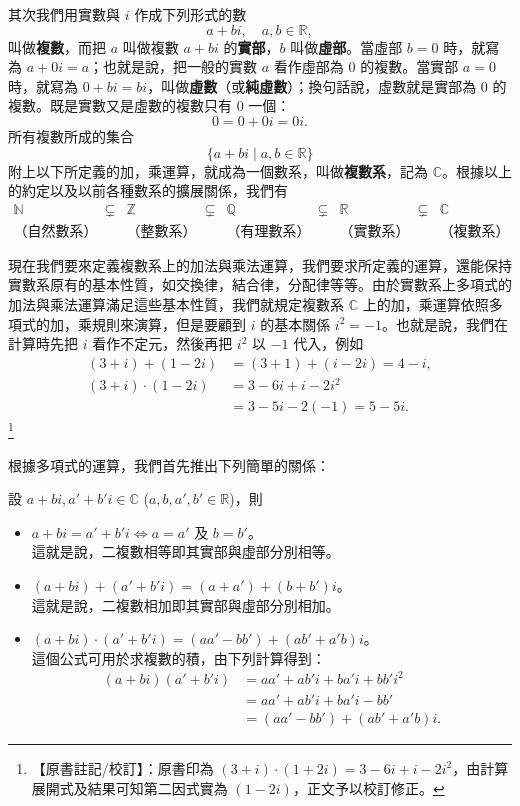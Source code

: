 其次我們用實數與 $i$ 作成下列形式的數
\[
a+bi, \quad a, b \in \mathbb{R},
\]
叫做\textbf{複數}，而把 $a$ 叫做複數 $a+bi$ 的\textbf{實部}，$b$ 叫做\textbf{虛部}。當虛部 $b=0$ 時，就寫為 $a+0i=a$；也就是說，把一般的實數 $a$ 看作虛部為 $0$ 的複數。當實部 $a=0$ 時，就寫為 $0+bi=bi$，叫做\textbf{虛數}（或\textbf{純虛數}）；換句話說，虛數就是實部為 $0$ 的複數。既是實數又是虛數的複數只有 $0$ 一個：
\[
0 = 0+0i = 0i.
\]
所有複數所成的集合
\[
\{a+bi \mid a, b \in \mathbb{R}\}
\]
附上以下所定義的加，乘運算，就成為一個數系，叫做\textbf{複數系}，記為 $\mathbb{C}$。根據以上的約定以及以前各種數系的擴展關係，我們有
\[
\begin{matrix}
\mathbb{N} & \subsetneq & \mathbb{Z} & \subsetneq & \mathbb{Q} & \subsetneq & \mathbb{R} & \subsetneq & \mathbb{C} \\
\text{（自然數系）} & & \text{（整數系）} & & \text{（有理數系）} & & \text{（實數系）} & & \text{（複數系）}
\end{matrix}
\]

現在我們要來定義複數系上的加法與乘法運算，我們要求所定義的運算，還能保持實數系原有的基本性質，如交換律，結合律，分配律等等。由於實數系上多項式的加法與乘法運算滿足這些基本性質，我們就規定複數系 $\mathbb{C}$ 上的加，乘運算依照多項式的加，乘規則來演算，但是要顧到 $i$ 的基本關係 $i^2=-1$。也就是說，我們在計算時先把 $i$ 看作不定元，然後再把 $i^2$ 以 $-1$ 代入，例如
\begin{align*}
(3+i)+(1-2i) &= (3+1)+(i-2i) = 4-i, \\
(3+i)\cdot(1-2i) &= 3-6i+i-2i^2 \\
&= 3-5i-2(-1) = 5-5i.
\end{align*}
\label{note:b4s-ch5-p256-errata}\footnote{【原書註記/校訂】：原書印為 $(3+i)\cdot(1+2i) = 3-6i+i-2i^2$，由計算展開式及結果可知第二因式實為 $(1-2i)$，正文予以校訂修正。}

根據多項式的運算，我們首先推出下列簡單的關係：

設 $a+bi, a'+b'i \in \mathbb{C}$ ($a, b, a', b' \in \mathbb{R}$)，則
\begin{itemize}
  \item[(i)] $a+bi = a'+b'i \iff a=a' \text{ 及 } b=b'$。 \\
  這就是說，二複數相等即其實部與虛部分別相等。
  \item[(ii)] $(a+bi)+(a'+b'i) = (a+a')+(b+b')i$。 \\
  這就是說，二複數相加即其實部與虛部分別相加。
  \item[(iii)] $(a+bi)\cdot(a'+b'i) = (aa'-bb')+(ab'+a'b)i$。 \\
  這個公式可用於求複數的積，由下列計算得到：
  \begin{align*}
  (a+bi)(a'+b'i) &= aa'+ab'i+ba'i+bb'i^2 \\
  &= aa'+ab'i+ba'i-bb' \\
  &= (aa'-bb')+(ab'+a'b)i.
  \end{align*}
\end{itemize}


